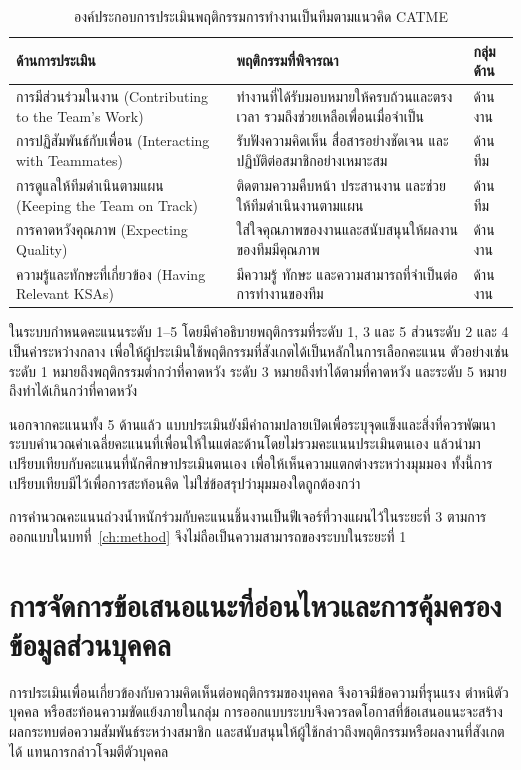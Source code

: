 \begin{table}[htbp]
\centering
\caption{องค์ประกอบการประเมินพฤติกรรมการทำงานเป็นทีมตามแนวคิด CATME}\label{tab:ch2-2}
\begin{tabularx}{\textwidth}{P{0.32\textwidth}Yl}
\hline
\textbf{ด้านการประเมิน} & \textbf{พฤติกรรมที่พิจารณา} & \textbf{กลุ่มด้าน} \\ \hline
การมีส่วนร่วมในงาน (Contributing to the Team's Work) & ทำงานที่ได้รับมอบหมายให้ครบถ้วนและตรงเวลา รวมถึงช่วยเหลือเพื่อนเมื่อจำเป็น & ด้านงาน \\
การปฏิสัมพันธ์กับเพื่อน (Interacting with Teammates) & รับฟังความคิดเห็น สื่อสารอย่างชัดเจน และปฏิบัติต่อสมาชิกอย่างเหมาะสม & ด้านทีม \\
การดูแลให้ทีมดำเนินตามแผน (Keeping the Team on Track) & ติดตามความคืบหน้า ประสานงาน และช่วยให้ทีมดำเนินงานตามแผน & ด้านทีม \\
การคาดหวังคุณภาพ (Expecting Quality) & ใส่ใจคุณภาพของงานและสนับสนุนให้ผลงานของทีมมีคุณภาพ & ด้านงาน \\
ความรู้และทักษะที่เกี่ยวข้อง (Having Relevant KSAs) & มีความรู้ ทักษะ และความสามารถที่จำเป็นต่อการทำงานของทีม & ด้านงาน \\ \hline
\end{tabularx}
\end{table}

ในระบบกำหนดคะแนนระดับ 1--5 โดยมีคำอธิบายพฤติกรรมที่ระดับ 1, 3 และ 5 ส่วนระดับ 2 และ 4 เป็นค่าระหว่างกลาง เพื่อให้ผู้ประเมินใช้พฤติกรรมที่สังเกตได้เป็นหลักในการเลือกคะแนน ตัวอย่างเช่น ระดับ 1 หมายถึงพฤติกรรมต่ำกว่าที่คาดหวัง ระดับ 3 หมายถึงทำได้ตามที่คาดหวัง และระดับ 5 หมายถึงทำได้เกินกว่าที่คาดหวัง

นอกจากคะแนนทั้ง 5 ด้านแล้ว แบบประเมินยังมีคำถามปลายเปิดเพื่อระบุจุดแข็งและสิ่งที่ควรพัฒนา ระบบคำนวณค่าเฉลี่ยคะแนนที่เพื่อนให้ในแต่ละด้านโดยไม่รวมคะแนนประเมินตนเอง แล้วนำมาเปรียบเทียบกับคะแนนที่นักศึกษาประเมินตนเอง เพื่อให้เห็นความแตกต่างระหว่างมุมมอง ทั้งนี้การเปรียบเทียบมีไว้เพื่อการสะท้อนคิด ไม่ใช่ข้อสรุปว่ามุมมองใดถูกต้องกว่า

การคำนวณคะแนนถ่วงน้ำหนักร่วมกับคะแนนชิ้นงานเป็นฟีเจอร์ที่วางแผนไว้ในระยะที่ 3 ตามการออกแบบในบทที่~\ref{ch:method} จึงไม่ถือเป็นความสามารถของระบบในระยะที่ 1

\section{การจัดการข้อเสนอแนะที่อ่อนไหวและการคุ้มครองข้อมูลส่วนบุคคล}

การประเมินเพื่อนเกี่ยวข้องกับความคิดเห็นต่อพฤติกรรมของบุคคล จึงอาจมีข้อความที่รุนแรง ตำหนิตัวบุคคล หรือสะท้อนความขัดแย้งภายในกลุ่ม การออกแบบระบบจึงควรลดโอกาสที่ข้อเสนอแนะจะสร้างผลกระทบต่อความสัมพันธ์ระหว่างสมาชิก และสนับสนุนให้ผู้ใช้กล่าวถึงพฤติกรรมหรือผลงานที่สังเกตได้ แทนการกล่าวโจมตีตัวบุคคล

